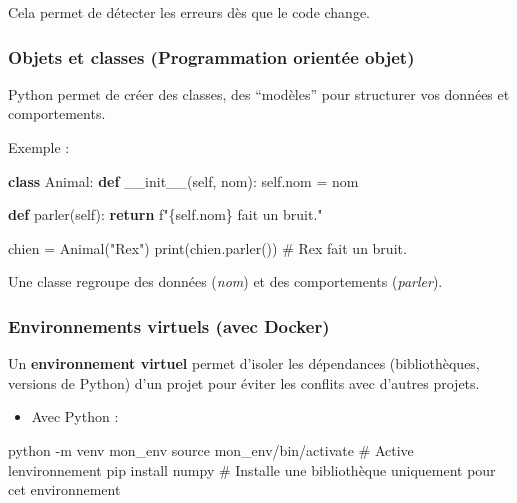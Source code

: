 \documentclass[
  letterpaper,
  DIV=11,
  numbers=noendperiod]{scrartcl}
\newenvironment{Shaded}{\begin{snugshade}}{\end{snugshade}}
\newcommand{\AttributeTok}[1]{\textcolor[rgb]{0.40,0.45,0.13}{#1}}
\newcommand{\BuiltInTok}[1]{\textcolor[rgb]{0.00,0.23,0.31}{#1}}
\newcommand{\CommentTok}[1]{\textcolor[rgb]{0.37,0.37,0.37}{#1}}
\newcommand{\ControlFlowTok}[1]{\textcolor[rgb]{0.00,0.23,0.31}{\textbf{#1}}}
\newcommand{\ExtensionTok}[1]{\textcolor[rgb]{0.00,0.23,0.31}{#1}}
\newcommand{\FunctionTok}[1]{\textcolor[rgb]{0.28,0.35,0.67}{#1}}
\newcommand{\KeywordTok}[1]{\textcolor[rgb]{0.00,0.23,0.31}{\textbf{#1}}}
\newcommand{\NormalTok}[1]{\textcolor[rgb]{0.00,0.23,0.31}{#1}}
\newcommand{\OperatorTok}[1]{\textcolor[rgb]{0.37,0.37,0.37}{#1}}
\newcommand{\SpecialCharTok}[1]{\textcolor[rgb]{0.37,0.37,0.37}{#1}}
\newcommand{\SpecialStringTok}[1]{\textcolor[rgb]{0.13,0.47,0.30}{#1}}
\newcommand{\StringTok}[1]{\textcolor[rgb]{0.13,0.47,0.30}{#1}}
\newcommand{\VariableTok}[1]{\textcolor[rgb]{0.07,0.07,0.07}{#1}}
\providecommand{\tightlist}{%
  \setlength{\itemsep}{0pt}\setlength{\parskip}{0pt}}\usepackage{longtable,booktabs,array}
\begin{document}
Cela permet de détecter les erreurs dès que le code change.

\subsubsection{Objets et classes (Programmation orientée
objet)}\label{objets-et-classes-programmation-orientuxe9e-objet}

Python permet de créer des classes, des ``modèles'' pour structurer vos
données et comportements.

Exemple :

\begin{Shaded}
\begin{Highlighting}[]
\KeywordTok{class}\NormalTok{ Animal:}
    \KeywordTok{def} \FunctionTok{\_\_init\_\_}\NormalTok{(}\VariableTok{self}\NormalTok{, nom):}
        \VariableTok{self}\NormalTok{.nom }\OperatorTok{=}\NormalTok{ nom}

    \KeywordTok{def}\NormalTok{ parler(}\VariableTok{self}\NormalTok{):}
        \ControlFlowTok{return} \SpecialStringTok{f"}\SpecialCharTok{\{}\VariableTok{self}\SpecialCharTok{.}\NormalTok{nom}\SpecialCharTok{\}}\SpecialStringTok{ fait un bruit."}

\NormalTok{chien }\OperatorTok{=}\NormalTok{ Animal(}\StringTok{"Rex"}\NormalTok{)}
\BuiltInTok{print}\NormalTok{(chien.parler())  }\CommentTok{\# Rex fait un bruit.}
\end{Highlighting}
\end{Shaded}

Une classe regroupe des données (\emph{nom}) et des comportements
(\emph{parler}).

\subsubsection{Environnements virtuels (avec
Docker)}\label{environnements-virtuels-avec-docker}

Un \textbf{environnement virtuel} permet d'isoler les dépendances
(bibliothèques, versions de Python) d'un projet pour éviter les conflits
avec d'autres projets.

\begin{itemize}
\tightlist
\item
  Avec Python :
\end{itemize}

\begin{Shaded}
\begin{Highlighting}[]
\ExtensionTok{python} \AttributeTok{{-}m}\NormalTok{ venv mon\_env}
\BuiltInTok{source}\NormalTok{ mon\_env/bin/activate  }\CommentTok{\# Active l\textquotesingle{}environnement}
\ExtensionTok{pip}\NormalTok{ install numpy            }\CommentTok{\# Installe une bibliothèque uniquement pour cet environnement}
\end{Highlighting}
\end{Shaded}
\end{document}
